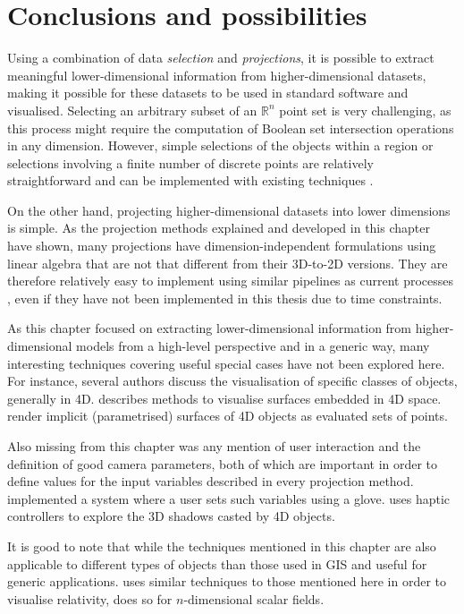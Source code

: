 \section{Conclusions and possibilities}
\label{se:slicing-conclusions}

Using a combination of data \emph{selection} and \emph{projections}, it is possible to extract meaningful lower-dimensional information from higher-dimensional datasets, making it possible for these datasets to be used in standard software and visualised.
Selecting an arbitrary subset of an $\mathbb{R}^n$ point set is very challenging, as this process might require the computation of Boolean set intersection operations in any dimension.
However, simple selections of the objects within a region or selections involving a finite number of discrete points are relatively straightforward and can be implemented with existing techniques \citep{Hanson94}.

On the other hand, projecting higher-dimensional datasets into lower dimensions is simple.
As the projection methods explained and developed in this chapter have shown, many projections have dimension-independent formulations using linear algebra that are not that different from their 3D-to-2D versions.
They are therefore relatively easy to implement using similar pipelines as current processes \citep{Chu09}, even if they have not been implemented in this thesis due to time constraints.

As this chapter focused on extracting lower-dimensional information from higher-dimensional models from a high-level perspective and in a generic way, many interesting techniques covering useful special cases have not been explored here.
For instance, several authors discuss the visualisation of specific classes of objects, generally in 4D.
\citet{Hoffmann90} describes methods to visualise surfaces embedded in 4D space.
\citet{Balsys07} render implicit (parametrised) surfaces of 4D objects as evaluated sets of points.

Also missing from this chapter was any mention of user interaction and the definition of good camera parameters, both of which are important in order to define values for the input variables described in every projection method.
\citet{Feiner90} implemented a system where a user sets such variables using a glove.
\citet{Zhang07} uses haptic controllers to explore the 3D shadows casted by 4D objects.

It is good to note that while the techniques mentioned in this chapter are also applicable to different types of objects than those used in GIS and useful for generic applications.
\citet{Hanson01} uses similar techniques to those mentioned here in order to visualise relativity, \citet{Bajaj98} does so for $n$-dimensional scalar fields.